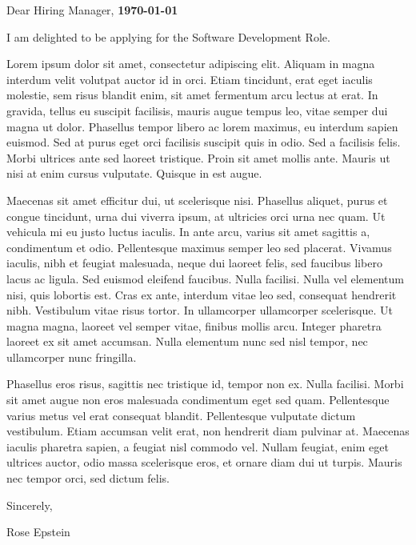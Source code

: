\documentclass[letterpaper,11pt]{article}
\newcommand{\roleName}{Software Development Role}
\begin{document}
    \vspace*{10pt}
    \par Dear Hiring Manager,  \hfill \textbf{\today}
    \vspace*{10pt}
    \par I am delighted to be applying for the \roleName{}.
    \vspace*{10pt}
    \par Lorem ipsum dolor sit amet, consectetur adipiscing elit. Aliquam in magna interdum velit volutpat auctor id in orci. Etiam tincidunt, erat eget iaculis molestie, sem risus blandit enim, sit amet fermentum arcu lectus at erat. In gravida, tellus eu suscipit facilisis, mauris augue tempus leo, vitae semper dui magna ut dolor. Phasellus tempor libero ac lorem maximus, eu interdum sapien euismod. Sed at purus eget orci facilisis suscipit quis in odio. Sed a facilisis felis. Morbi ultrices ante sed laoreet tristique. Proin sit amet mollis ante. Mauris ut nisi at enim cursus vulputate. Quisque in est augue.
    \vspace*{10pt}
    \par Maecenas sit amet efficitur dui, ut scelerisque nisi. Phasellus aliquet, purus et congue tincidunt, urna dui viverra ipsum, at ultricies orci urna nec quam. Ut vehicula mi eu justo luctus iaculis. In ante arcu, varius sit amet sagittis a, condimentum et odio. Pellentesque maximus semper leo sed placerat. Vivamus iaculis, nibh et feugiat malesuada, neque dui laoreet felis, sed faucibus libero lacus ac ligula. Sed euismod eleifend faucibus. Nulla facilisi. Nulla vel elementum nisi, quis lobortis est. Cras ex ante, interdum vitae leo sed, consequat hendrerit nibh. Vestibulum vitae risus tortor. In ullamcorper ullamcorper scelerisque. Ut magna magna, laoreet vel semper vitae, finibus mollis arcu. Integer pharetra laoreet ex sit amet accumsan. Nulla elementum nunc sed nisl tempor, nec ullamcorper nunc fringilla.
    \vspace*{10pt}
    \par Phasellus eros risus, sagittis nec tristique id, tempor non ex. Nulla facilisi. Morbi sit amet augue non eros malesuada condimentum eget sed quam. Pellentesque varius metus vel erat consequat blandit. Pellentesque vulputate dictum vestibulum. Etiam accumsan velit erat, non hendrerit diam pulvinar at. Maecenas iaculis pharetra sapien, a feugiat nisl commodo vel. Nullam feugiat, enim eget ultrices auctor, odio massa scelerisque eros, et ornare diam dui ut turpis. Mauris nec tempor orci, sed dictum felis.
    \vspace*{10pt}
    \par Sincerely,
    \par Rose Epstein
\end{document}
